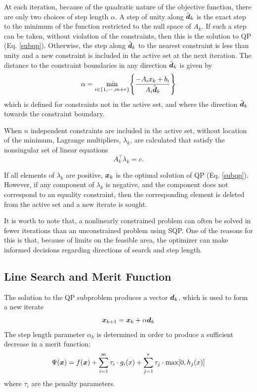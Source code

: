 \documentclass[journal,comsoc]{IEEEtran}
\begin{document}
 At each iteration, because of the quadratic nature of the objective function, there are only two choices of step length $\alpha$. A step of unity along $\hat{\mbox{\boldmath $d$}}_k$ is the exact step to the minimum of the function restricted to the null space of $A_k$. If such a step can be taken, without violation of the constraints, then this is the solution to QP (Eq. \ref{subqp}). Otherwise, the step along $\hat{\mbox{\boldmath $d$}}_k$ to the nearest constraint is less than unity and a new constraint is included in the active set at the next iteration. The distance to the constraint boundaries in any direction $\hat{\mbox{\boldmath $d$}}_k$ is given by
 \begin{equation*}
     \alpha = \min_{i \in \{1,\cdots, m+r\}} \Biggl\{ \frac{-A_ix_k + b_i}{A_i \hat{\mbox{\boldmath $d$}}_k} \Biggr\}
 \end{equation*}
which is defined for constraints not in the active set, and where the direction $\hat{\mbox{\boldmath $d$}}_k$ towards the constraint boundary.

When $n$ independent constraints are included in the active set, without location of the minimum, Lagrange multipliers, $\lambda_k$, are calculated that satisfy the nonsingular set of linear equations
\begin{equation*}
    A_k^\top \lambda_k = c.
\end{equation*}

If all elements of $\lambda_k$ are positive, $\mbox{\boldmath $x$}_k$ is the optimal solution of QP (Eq. \ref{subqp}). However, if any component of $\lambda_k$ is negative, and the component does not correspond to an equality constraint, then the corresponding element is deleted from the active set and a new iterate is sought.

It is worth to note that, a nonlinearly constrained problem can often be solved in fewer iterations than an unconstrained problem using SQP. One of the reasons for this is that, because of limits on the feasible area, the optimizer can make informed decisions regarding directions of search and step length.

\subsection{Line Search and Merit Function}

The solution to the QP subproblem produces a vector $\mbox{\boldmath $d$}_k$, which is used to form a new iterate
\begin{equation*}
    \mbox{\boldmath $x$}_{k+1} = \mbox{\boldmath $x$}_k + \alpha \mbox{\boldmath $d$}_k
\end{equation*}
The step length parameter $\alpha_k$ is determined in order to produce a sufficient decrease in a merit function:
\begin{equation*}
    \Psi(\mbox{\boldmath $x$}) = f(\mbox{\boldmath $x$}) + \sum_{i=1}^m \tau_i \cdot g_i(x) + \sum_{j=1}^r \tau_j \cdot \max [0,  h_j(x)]
\end{equation*}
where $\tau_i$ are the penalty parameters.
\end{document}
